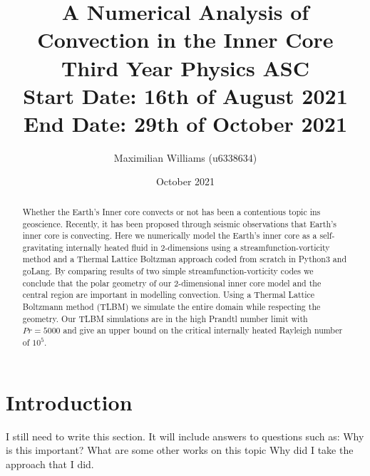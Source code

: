 \documentclass{article}
\title{%
  A Numerical Analysis of Convection in the Inner Core \\
  \large Third Year Physics ASC  \\
    Start Date: 16th of August 2021 End Date: 29th of October 2021}
\author{Maximilian Williams (u6338634)}
\date{October 2021}
\begin{document}
\maketitle

\begin{abstract}

	\noindent Whether the Earth's Inner core convects or not has been a contentious topic ins geoscience. Recently, it has been proposed through seismic 
	observations that Earth's inner core is convecting. Here we numerically model the Earth's inner core as a self-gravitating internally heated fluid 
	in 2-dimensions using a streamfunction-vorticity method and a Thermal Lattice Boltzman approach coded from scratch in Python3 and goLang. By 
	comparing results of two simple 
	streamfunction-vorticity codes we conclude that the polar geometry of our 2-dimensional inner core model and the central region are important in 
	modelling convection. Using a Thermal Lattice Boltzmann method (TLBM) we simulate the entire domain while respecting the geometry. Our TLBM simulations are in the high Prandtl number limit with $Pr=5000$ and give an upper bound on the critical internally heated Rayleigh number of $10^5$. 
 
\end{abstract}

\section*{Introduction}






I still need to write this section. It will include answers to questions such as: 
\newline
Why is this important?
\newline
What are some other works on this topic
\newline
Why did I take the approach that I did.
\end{document}
